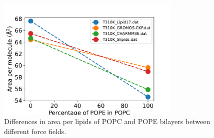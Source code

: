 \documentclass[fleqn,10pt]{wlscirep}
\begin{document}
\begin{figure}[tbp]
    \centering
    \includegraphics[width=88mm]{Figures/APL.pdf}
    \caption{Differences in area per lipids of POPC and POPE bilayers between different force fields.  
    }
    \label{fig:POPCPOPEapls}
\end{figure}








\end{document}
